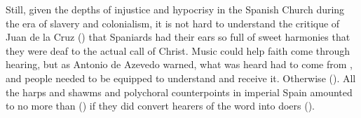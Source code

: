 Still, given the depths of injustice and hypocrisy in the Spanish Church during
the era of slavery and colonialism, it is not hard to understand the critique
of Juan de la Cruz () that Spaniards had their ears so
full of sweet harmonies that they were deaf to the actual call of Christ.%
    \Autocite
    [, , ]
    {JuandelaCruz:Subida}
Music could help faith come through hearing, but as Antonio de Azevedo warned,
what was heard had to come from , and people needed
to be equipped to understand and receive it.%
    \Autocite{Azevedo:Catecismo}
Otherwise 
().
All the harps and shawms and polychoral counterpoints in imperial Spain
amounted to no more than 
() if they did convert hearers of the word into doers
().

